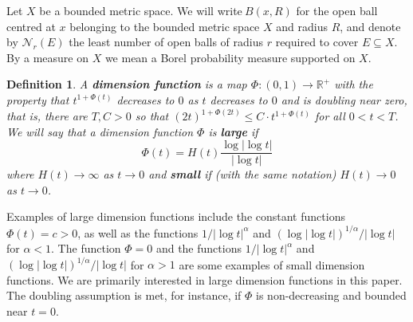 \documentclass{amsart}
\theoremstyle{plain}
\newtheorem{definition}{Definition}
\numberwithin{equation}{section}
\begin{document}
\label{sec:phidim}



Let $X$ be a bounded metric space. We will write$\ B(x,R)$ for the open ball
centred at $x$ belonging to the bounded metric space $X$ and radius $R$, and
denote by ${\mathcal{N}}_{r}(E)$ the least number of open balls of radius $r$
required to cover $E\subseteq X$. By a measure on $X$ we mean a Borel
probability measure supported on $X$.

\begin{definition} \label{def:phi}
A \textbf{dimension function} is a map $\Phi :(0,1)\rightarrow \mathbb{R}^{+}$ with the property that 
$t^{1+\Phi (t)}$ decreases to $0$ as $t$ decreases to $0$ and is doubling near zero, that is, there are $T,C > 0$
so that $(2 t)^{1 + \Phi(2 t)} \le C \cdot t^{1 + \Phi(t)}$ for all $0 < t < T$.
 We will say that a dimension function $\Phi$ is \textbf{large} if 
\begin{equation*}
    \Phi (t)=H(t)\frac{\log \left| \log t\right|}{\left| \log t\right|}
\end{equation*}
where $H(t)\rightarrow \infty$ as $t\rightarrow 0$ and \textbf{small} if
(with the same notation) $H(t)\rightarrow 0$ as $t\rightarrow 0$.
\end{definition}

Examples of large dimension functions include the constant functions $\Phi(t)=c>0$, as well as the functions 
$1/|\log t|^{\alpha}$ and $(\log\left| \log t\right|)^{1/\alpha}/\left| \log t\right|$
for $\alpha <1$. The function $\Phi =0$ and the functions $1/|\log
t|^{\alpha}$ and $(\log \left| \log t\right|)^{1/\alpha
}/\left| \log t\right| $ for $\alpha >1$ are some examples of small
dimension functions. We are primarily interested in large dimension
functions in this paper.
The doubling assumption is met, for instance, if $\Phi$ is non-decreasing and bounded near $t=0$.
\end{document}
